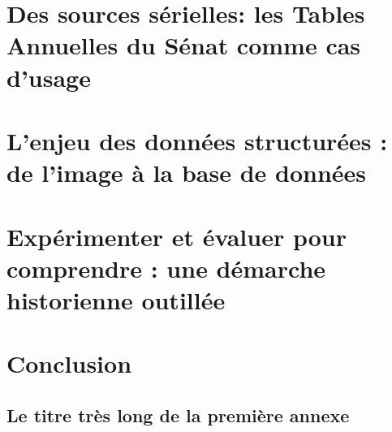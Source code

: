 \documentclass[12pt,twoside]{book}
\begin{document}
\newpage{\pagestyle{empty}\cleardoublepage}


\mainmatter

\part{Des sources sérielles: les Tables Annuelles du Sénat comme cas d'usage}

\part{L'enjeu des données structurées : de l'image à la base de données}

\part{Expérimenter et évaluer pour comprendre : une démarche historienne outillée}


\part{Conclusion}


\appendix %

\chapter[Titre court]{Le titre très long de la première annexe}

%

\newpage{\pagestyle{empty}\cleardoublepage}


\backmatter %

\tableofcontents
\end{document}

